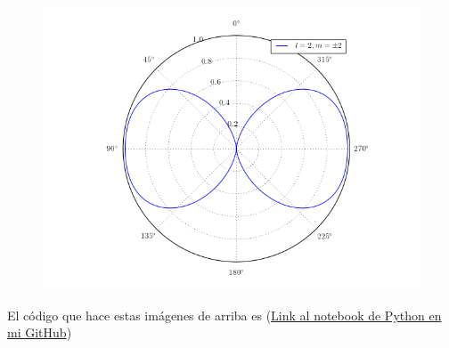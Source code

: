 \documentclass[a4paper,11pt]{article}
\numberwithin{equation}{section}
\begin{document}
\begin{figure}[H]
 \center
 \includegraphics[scale=0.6]{problema3fig6}
\end{figure}

El código que hace estas imágenes de arriba es 
(\href{https://github.com/FavioVazquez/Electrodinamica-Clasica-PCF/blob/master/Tarea9/Problema3.ipynb}{Link al 
notebook de Python en mi GitHub})
\end{document}
